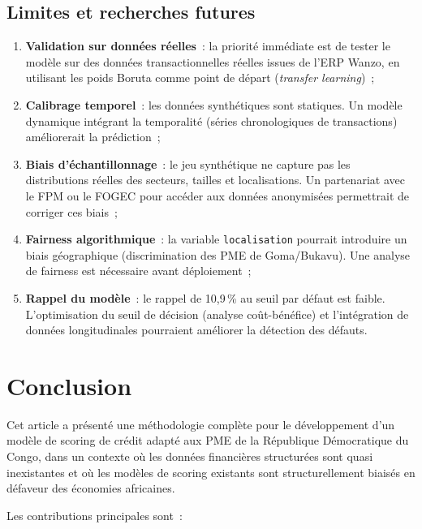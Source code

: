 \documentclass[12pt, a4paper, twocolumn]{article}
\begin{document}
\subsection{Limites et recherches futures}
\label{subsec:limites}

\begin{enumerate}[leftmargin=*]
  \item \textbf{Validation sur données réelles}~: la priorité immédiate est de tester le modèle sur des données transactionnelles réelles issues de l'ERP Wanzo, en utilisant les poids Boruta comme point de départ (\textit{transfer learning})~;
  \item \textbf{Calibrage temporel}~: les données synthétiques sont statiques. Un modèle dynamique intégrant la temporalité (séries chronologiques de transactions) améliorerait la prédiction~;
  \item \textbf{Biais d'échantillonnage}~: le jeu synthétique ne capture pas les distributions réelles des secteurs, tailles et localisations. Un partenariat avec le FPM ou le FOGEC pour accéder aux données anonymisées permettrait de corriger ces biais~;
  \item \textbf{Fairness algorithmique}~: la variable \texttt{localisation} pourrait introduire un biais géographique (discrimination des PME de Goma/Bukavu). Une analyse de fairness est nécessaire avant déploiement~;
  \item \textbf{Rappel du modèle}~: le rappel de 10,9\,\% au seuil par défaut est faible. L'optimisation du seuil de décision (analyse coût-bénéfice) et l'intégration de données longitudinales pourraient améliorer la détection des défauts.
\end{enumerate}

\section{Conclusion}
\label{sec:conclusion}

Cet article a présenté une méthodologie complète pour le développement d'un modèle de scoring de crédit adapté aux PME de la République Démocratique du Congo, dans un contexte où les données financières structurées sont quasi inexistantes et où les modèles de scoring existants sont structurellement biaisés en défaveur des économies africaines.

Les contributions principales sont~:
\end{document}
